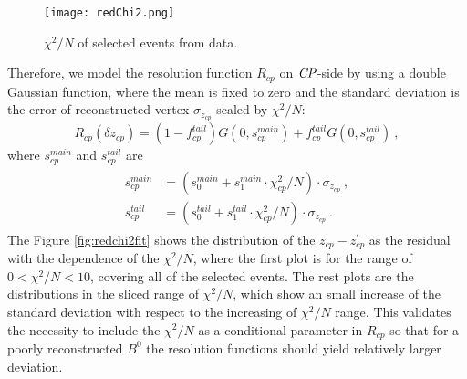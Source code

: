 \begin{figure}[htpb]
	\centering
	\texttt{[image: redChi2.png]}
	\caption{$\chi^2/N$ of selected events from data.}
	\label{fig:redchi2}
\end{figure}

Therefore, we model the resolution function $R_{cp}$ on $\it{CP}$-side by using a double Gaussian function, where the mean is fixed to zero and the standard deviation is the error of reconstructed vertex $\sigma_{z_{cp}}$ scaled by $\chi^2/N$:
\begin{equation}\label{eq:Rcp}
R_{cp}(\delta z_{cp}) = (1-f_{cp}^{tail})G(0,s_{cp}^{main})+
f_{cp}^{tail}G(0,s_{cp}^{tail})~,
\end{equation}
where $s_{cp}^{main}$ and $s_{cp}^{tail}$ are
\begin{eqnarray}\label{eq:scp_mt}
\begin{split}
s_{cp}^{main}&=(s_0^{main} + s_1^{main}\cdot \chi^2_{cp}/N )\cdot \sigma_{z_{cp}}~,\\
s_{cp}^{tail}&=(s_0^{tail} + s_1^{tail}\cdot \chi^2_{cp}/N )\cdot \sigma_{z_{cp}}~.
\end{split}
\end{eqnarray} 
The Figure \ref{fig:redchi2fit} shows the distribution of the $z_{cp}-z_{cp}^{'}$ as the residual with the dependence of the $\chi^2/N$, where the first plot is for the range of  $0<\chi^2/N<10$, covering all of the selected events. The rest plots are the distributions in the sliced range of $\chi^2/N$, which show an small increase of the standard deviation with respect to the increasing of $\chi^2/N$ range. This validates the necessity to include the $\chi^2/N$ as a conditional parameter in $R_{cp}$ so that for a poorly reconstructed $B^0$ the resolution functions should yield relatively larger deviation.

